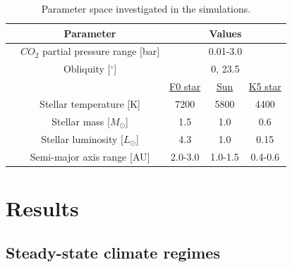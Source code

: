 \documentclass[fleqn,usenatbib]{mnras}
\providecommand{\DIFadd}[1]{{\bf #1}} %
\providecommand{\DIFaddbegin}{} %
\newcommand{\DIFaddincludegraphics}[2][]{{\color{blue}\fbox{\DIFOincludegraphics[#1]{#2}}}} %
\DeclareRobustCommand{\DIFaddbegin}{\DIFOaddbegin \let\includegraphics\DIFaddincludegraphics} %
\begin{document}

\begin{table}
	\centering
	\caption{Parameter space investigated in the simulations.}
	\label{tab:parameters}
	\begin{tabular}{ccccc}
		\hline
		&\multicolumn{1}{c}{Parameter}&\multicolumn{3}{c}{Values}\\
		\hline
		&\multicolumn{1}{c}{$CO_{\mathrm{2}}$ partial pressure range [bar]}&\multicolumn{3}{c}{0.01-3.0}\\
		&\multicolumn{1}{c}{Obliquity [$^{\circ}$] }&\multicolumn{3}{c}{0, 23.5}\\
		&\multicolumn{1}{c}{}&\multicolumn{1}{c}{\underline{F0 star}}&\multicolumn{1}{c}{\underline{Sun}}&\multicolumn{1}{c}{\underline{K5 star}}\\
		&\multicolumn{1}{c}{Stellar temperature [K]}&\multicolumn{1}{c}{7200}&\multicolumn{1}{c}{5800}&\multicolumn{1}{c}{4400}\\
		&\multicolumn{1}{c}{Stellar mass [$M_{\odot}$]}&\multicolumn{1}{c}{1.5}&\multicolumn{1}{c}{1.0}&\multicolumn{1}{c}{0.6}\\
		&\multicolumn{1}{c}{Stellar luminosity [$L_{\odot}$]}&\multicolumn{1}{c}{4.3}&\multicolumn{1}{c}{1.0}&\multicolumn{1}{c}{0.15}\\
		&\multicolumn{1}{c}{Semi-major axis range [AU]}&\multicolumn{1}{c}{2.0-3.0}&\multicolumn{1}{c}{1.0-1.5}&\multicolumn{1}{c}{0.4-0.6}\\
		\hline
	\end{tabular}
\end{table}

\section{Results}

\DIFaddbegin \subsection{\DIFadd{Steady-state climate regimes}}
\end{document}
